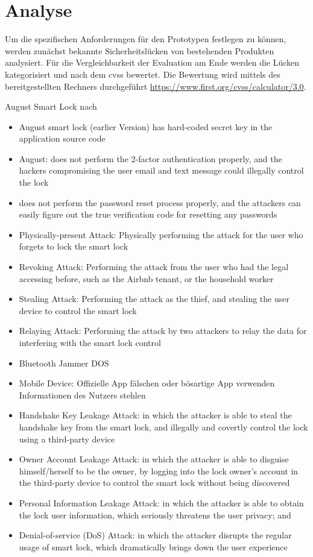 \section{Analyse}
\label{sec:analysis}
	
	Um die spezifischen Anforderungen für den Prototypen festlegen zu können, werden zunächst bekannte Sicherheitslücken von bestehenden Produkten analysiert. 
	Für die Vergleichbarkeit der Evaluation am Ende werden die Lücken kategorisiert und nach dem \gls{cvss} bewertet.
	Die Bewertung wird mittels des bereitgestellten Rechners durchgeführt \url{https://www.first.org/cvss/calculator/3.0}.


	August Smart Lock nach \cite{Ye2017}
	\begin{itemize}
		\item August smart lock (earlier Version) has hard-coded secret key in the application source code \cite{Rose2016}
		\item August: does not perform the 2-factor authentication properly, and the hackers compromising the user email and text message could illegally control the lock
		\item does not perform the password reset process properly, and the	attackers can easily figure out the true verification code for resetting any passwords
		\item Physically-present Attack: Physically performing the attack for the user	who forgets to lock the smart lock
		\item Revoking Attack: Performing the attack from the user who had the legal accessing before, such as the Airbnb tenant, or the household worker
		\item Stealing Attack: Performing the attack as the thief, and stealing the user device to control the smart lock
		\item Relaying Attack: Performing the attack by two attackers to relay the data for interfering with the smart lock control
		\item Bluetooth Jammer \textrightarrow DOS
		\item Mobile Device: Offizielle App fälschen oder bösartige App verwenden \textrightarrow Informationen des Nutzers stehlen \textrightarrow 
		\item Handshake Key Leakage Attack: in which the attacker is able to steal the handshake key from the smart lock, and	illegally and covertly control the lock using a third-party	device
		\item Owner Account Leakage Attack: in which the attacker is able to disguise himself/herself to be the owner, by logging into the lock owner’s account in the third-party device to control the smart lock without being discovered
		\item Personal Information Leakage Attack: in which the attacker is able to obtain the lock user information, which seriously threatens the user privacy; and
		\item Denial-of-service (DoS) Attack: in which the attacker disrupts the regular usage of smart lock, which dramatically	brings down the user experience
	\end{itemize}

